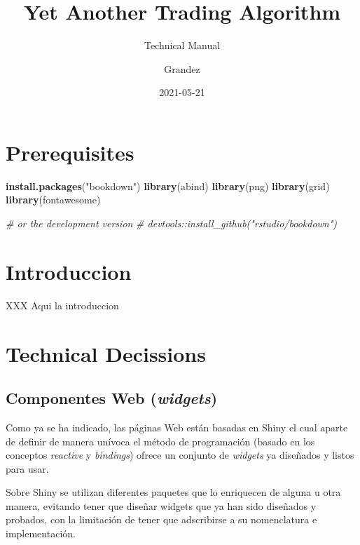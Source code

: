 \documentclass[
]{book}
\title{Yet Another Trading Algorithm}
\subtitle{Technical Manual}
\author{Grandez}
\date{2021-05-21}
\newenvironment{Shaded}{\begin{snugshade}}{\end{snugshade}}
\newcommand{\CommentTok}[1]{\textcolor[rgb]{0.56,0.35,0.01}{\textit{#1}}}
\newcommand{\KeywordTok}[1]{\textcolor[rgb]{0.13,0.29,0.53}{\textbf{#1}}}
\newcommand{\NormalTok}[1]{#1}
\newcommand{\StringTok}[1]{\textcolor[rgb]{0.31,0.60,0.02}{#1}}
\begin{document}
\maketitle

{
\setcounter{tocdepth}{1}
\tableofcontents
}
\hypertarget{prerequisites}{%
\chapter{Prerequisites}\label{prerequisites}}

\begin{Shaded}
\begin{Highlighting}[]
\KeywordTok{install.packages}\NormalTok{(}\StringTok{"bookdown"}\NormalTok{)}
\KeywordTok{library}\NormalTok{(abind)}
\KeywordTok{library}\NormalTok{(png)}
\KeywordTok{library}\NormalTok{(grid)}
\KeywordTok{library}\NormalTok{(fontawesome)}

\CommentTok{# or the development version}
\CommentTok{# devtools::install_github("rstudio/bookdown")}
\end{Highlighting}
\end{Shaded}

\hypertarget{introduccion}{%
\chapter*{Introduccion}\label{introduccion}}

XXX Aqui la introduccion

\hypertarget{technical-decissions}{%
\chapter{Technical Decissions}\label{technical-decissions}}

\hypertarget{componentes-web-widgets}{%
\section{\texorpdfstring{Componentes Web (\emph{widgets})}{Componentes Web (widgets)}}\label{componentes-web-widgets}}

Como ya se ha indicado, las páginas Web están basadas en Shiny el cual aparte de definir de manera unívoca el método de programación (basado en los conceptos \emph{reactive} y \emph{bindings}) ofrece un conjunto de \emph{widgets} ya diseñados y listos para usar.

Sobre Shiny se utilizan diferentes paquetes que lo enriquecen de alguna u otra manera, evitando tener que diseñar widgets que ya han sido diseñados y probados, con la limitación de tener que adscribirse a su nomenclatura e implementación.
\end{document}
